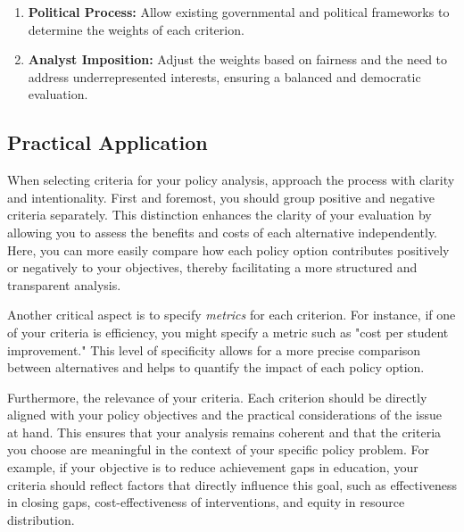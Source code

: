 \documentclass{article}
\theoremstyle{definition}
\theoremstyle{plain}
\begin{document}
\begin{enumerate}[label=\arabic*.]
    \item \textbf{Political Process:} Allow existing governmental and political frameworks to determine the weights of each criterion.
    
    \item \textbf{Analyst Imposition:} Adjust the weights based on fairness and the need to address underrepresented interests, ensuring a balanced and democratic evaluation.
\end{enumerate}

\subsection{Practical Application}

When selecting criteria for your policy analysis, approach
the process with clarity and intentionality. First and foremost, you should
group positive and negative criteria separately. This distinction enhances the
clarity of your evaluation by allowing you to assess the benefits and costs of
each alternative independently. Here, you can
more easily compare how each policy option contributes positively or negatively
to your objectives, thereby facilitating a more structured and transparent
analysis. 

Another critical aspect is to specify \textit{metrics} for each criterion. For
instance, if one of your criteria is efficiency, you might specify a metric such
as "cost per student improvement." This level of specificity allows for a more
precise comparison between alternatives and helps to quantify the impact of each
policy option. 

Furthermore, the relevance of your criteria. Each
criterion should be directly aligned with your policy objectives and the
practical considerations of the issue at hand. This ensures that your
analysis remains coherent and that the criteria you choose are meaningful in the
context of your specific policy problem. For example, if your objective is to
reduce achievement gaps in education, your criteria should reflect factors that
directly influence this goal, such as effectiveness in closing gaps,
cost-effectiveness of interventions, and equity in resource distribution. 


\end{document}
